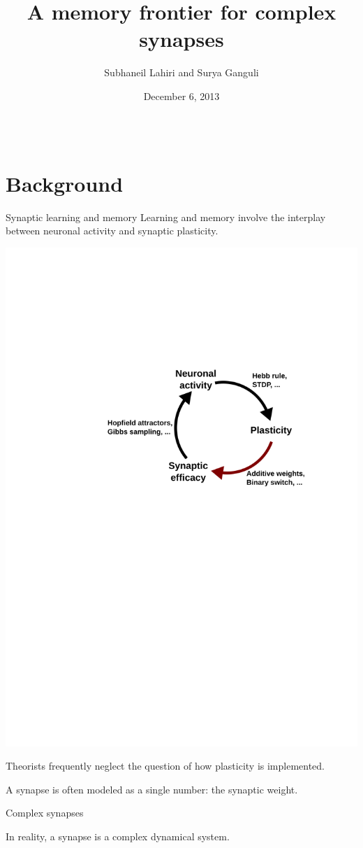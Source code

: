 \documentclass[final,hyperref={pdfpagelabels=false,bookmarks=false}]{beamer}
\title{A memory frontier for complex synapses}
\author{Subhaneil Lahiri and Surya Ganguli}
\institute[Stanford]{%
Department of Applied Physics, Stanford University, Stanford CA
}
\date{December 6, 2013}
\begin{document}
\begin{frame}{}

\begin{columns}[t]


\begin{column}{0.33\linewidth}

\section{Background}



\begin{block}{Synaptic learning and memory}
%
 Learning and memory involve the interplay between neuronal activity and synaptic plasticity.

 \begin{center}
   \includegraphics[width=0.4\linewidth]{synaptic_learning.svg}
 \end{center}

 Theorists frequently neglect the question of how plasticity is implemented.

 A synapse is often modeled as a single number: the synaptic weight.
%
\end{block}


\begin{block}{Complex synapses}
%
 \begin{minipage}[t]{0.53\linewidth}
   In reality, a synapse is a complex dynamical system.


\end{minipage}
\end{block}
\end{column}
\end{columns}
\end{frame}
\end{document}

